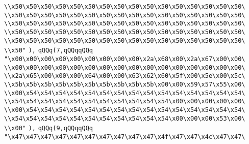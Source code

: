 \verb|\\x50\x50\x50\x50\x50\x50\x50\x50\x50\x50\x50\x50\x50\x50\x50\x50\|\newline
\verb|\\x50\x50\x50\x50\x50\x50\x50\x50\x50\x50\x50\x50\x50\x50\x50\x50\|\newline
\verb|\\x50\x50\x50\x50\x50\x50\x50\x50\x50\x50\x50\x50\x50\x50\x50\x50\|\newline
\verb|\\x50\x50\x50\x50\x50\x50\x50\x50\x50\x50\x50\x50\x50\x50\x50\x50\|\newline
\verb|\\x50\x50\x50\x50\x50\x50\x50\x50\x50\x50\x50\x50\x50\x50\x50\x50\|\newline
\verb|\\x50"|\newline
\verb|),|\newline
\verb|qQQq(7,qQQqqQQq|\newline
\verb|"\x00\x00\x00\x00\x00\x00\x00\x00\x00\x2a\x68\x00\x2a\x67\x00\x00\|\newline
\verb|\\x00\x00\x00\x00\x00\x00\x00\x00\x00\x00\x00\x00\x00\x00\x00\x00\|\newline
\verb|\\x2a\x65\x00\x00\x00\x64\x00\x00\x63\x62\x60\x5f\x00\x5e\x00\x5c\|\newline
\verb|\\x5b\x5b\x5b\x5b\x5b\x5b\x5b\x5b\x5b\x5b\x00\x00\x59\x57\x55\x00\|\newline
\verb|\\x00\x54\x54\x54\x54\x54\x54\x54\x54\x54\x54\x54\x54\x54\x54\x54\|\newline
\verb|\\x54\x54\x54\x54\x54\x54\x54\x54\x54\x54\x54\x00\x00\x00\x00\x00\|\newline
\verb|\\x00\x54\x54\x54\x54\x54\x54\x54\x54\x54\x54\x54\x54\x54\x54\x54\|\newline
\verb|\\x54\x54\x54\x54\x54\x54\x54\x54\x54\x54\x54\x00\x00\x00\x53\x00\|\newline
\verb|\\x00"|\newline
\verb|),|\newline
\verb|qQQq(9,qQQqqQQq|\newline
\verb|"\x47\x47\x47\x47\x47\x47\x47\x47\x47\x47\x4f\x47\x47\x4c\x47\x47\|\newline
